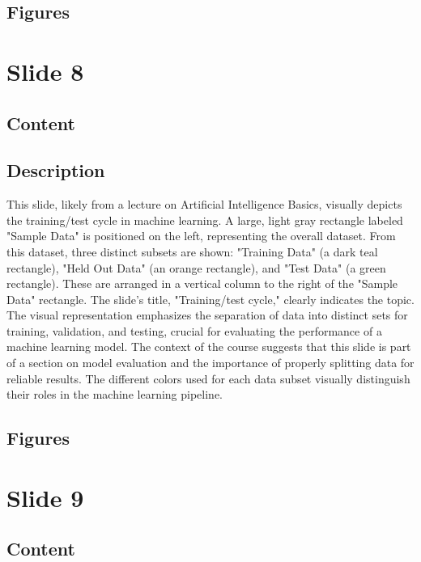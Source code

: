 \documentclass{article}%
\begin{document}
\subsection{Figures}%
\begin{figure}[H]%
\centering%
\end{figure}

%
\newpage%
\section{Slide 8}%
\label{sec:Slide8}%
\subsection{Content}%
%
\subsection{Description}%
This slide, likely from a lecture on Artificial Intelligence Basics, visually depicts the training/test cycle in machine learning.  A large, light gray rectangle labeled "Sample Data" is positioned on the left, representing the overall dataset.  From this dataset, three distinct subsets are shown: "Training Data" (a dark teal rectangle), "Held Out Data" (an orange rectangle), and "Test Data" (a green rectangle).  These are arranged in a vertical column to the right of the "Sample Data" rectangle.  The slide's title, "Training/test cycle," clearly indicates the topic.  The visual representation emphasizes the separation of data into distinct sets for training, validation, and testing, crucial for evaluating the performance of a machine learning model.  The context of the course suggests that this slide is part of a section on model evaluation and the importance of properly splitting data for reliable results.  The different colors used for each data subset visually distinguish their roles in the machine learning pipeline.%
\subsection{Figures}%
\begin{figure}[H]%
\centering%
\end{figure}

%
\newpage%
\section{Slide 9}%
\label{sec:Slide9}%
\subsection{Content}%
%
\end{document}
